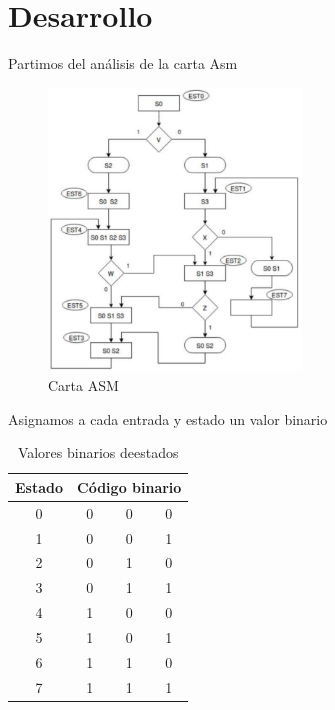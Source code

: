 \documentclass[table]{scrartcl}
\begin{document}
\section{Desarrollo}\label{sec:orgac7043c}
Partimos del análisis de la carta Asm
\begin{figure}[htbp]
  \centering
  \includegraphics[width=0.6\textwidth]{./img/4.png}
  \caption{Carta ASM}\label{fig:4}
\end{figure}
Asignamos a cada entrada y estado un valor binario
\begin{table}[H]
  \centering
  \caption{Valores binarios deestados}
\begin{tabular}{|c|ccc|}
\hline
\multicolumn{1}{|l|}{Estado} & \multicolumn{3}{l|}{Código binario} \\ \hline
\rowcolor[HTML]{FFE599}
0 & \multicolumn{1}{c|}{\cellcolor[HTML]{FFE599}0} & \multicolumn{1}{c|}{\cellcolor[HTML]{FFE599}0} & 0 \\ \hline
\rowcolor[HTML]{B6D7A8}
1 & \multicolumn{1}{c|}{\cellcolor[HTML]{B6D7A8}0} & \multicolumn{1}{c|}{\cellcolor[HTML]{B6D7A8}0} & 1 \\ \hline
\rowcolor[HTML]{A2C4C9}
2 & \multicolumn{1}{c|}{\cellcolor[HTML]{A2C4C9}0} & \multicolumn{1}{c|}{\cellcolor[HTML]{A2C4C9}1} & 0 \\ \hline
\rowcolor[HTML]{A4C2F4}
3 & \multicolumn{1}{c|}{\cellcolor[HTML]{A4C2F4}0} & \multicolumn{1}{c|}{\cellcolor[HTML]{A4C2F4}1} & 1 \\ \hline
\rowcolor[HTML]{9FC5E8}
4 & \multicolumn{1}{c|}{\cellcolor[HTML]{9FC5E8}1} & \multicolumn{1}{c|}{\cellcolor[HTML]{9FC5E8}0} & 0 \\ \hline
\rowcolor[HTML]{B4A7D6}
5 & \multicolumn{1}{c|}{\cellcolor[HTML]{B4A7D6}1} & \multicolumn{1}{c|}{\cellcolor[HTML]{B4A7D6}0} & 1 \\ \hline
\rowcolor[HTML]{D5A6BD}
6 & \multicolumn{1}{c|}{\cellcolor[HTML]{D5A6BD}1} & \multicolumn{1}{c|}{\cellcolor[HTML]{D5A6BD}1} & 0 \\ \hline
\rowcolor[HTML]{D9D2E9}
7 & \multicolumn{1}{c|}{\cellcolor[HTML]{D9D2E9}1} & \multicolumn{1}{c|}{\cellcolor[HTML]{D9D2E9}1} & 1 \\ \hline
\end{tabular}
\end{table}
\end{document}
